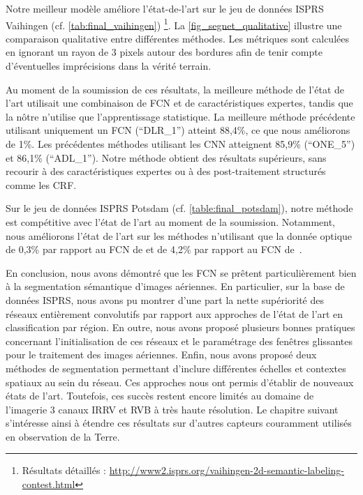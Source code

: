 Notre meilleur modèle améliore l'état-de-l'art sur le jeu de données ISPRS Vaihingen (cf. \cref{tab:final_vaihingen}) \footnote{Résultats détaillés : \url{http://www2.isprs.org/vaihingen-2d-semantic-labeling-contest.html}}. La \cref{fig_segnet_qualitative} illustre une comparaison qualitative entre différentes méthodes. Les métriques sont calculées en ignorant un rayon de $3$ pixels autour des bordures afin de tenir compte d'éventuelles imprécisions dans la vérité terrain.

Au moment de la soumission de ces résultats, la meilleure méthode de l'état de l'art utilisait une combinaison de \gls{FCN} et de caractéristiques expertes, tandis que la nôtre n'utilise que l'apprentissage statistique. La meilleure méthode précédente utilisant uniquement un \gls{FCN} (``DLR\_1'') atteint 88,4\%, ce que nous améliorons de 1\%. Les précédentes méthodes utilisant les \gls{CNN} atteignent 85,9\% (``ONE\_5''\cite{boulch_dag_2015}) et 86,1\% (``ADL\_1''\cite{paisitkriangkrai_effective_2015}). Notre méthode obtient des résultats supérieurs, sans recourir à des caractéristiques expertes ou à des post-traitement structurés comme les \gls{CRF}.

Sur le jeu de données ISPRS Potsdam (cf. \cref{table:final_potsdam}), notre méthode est compétitive avec l'état de l'art au moment de la soumission. Notamment, nous améliorons l'état de l'art sur les méthodes n'utilisant que la donnée optique de 0,3\% par rapport au \gls{FCN} de \citet{sherrah_fully_2016} et de 4,2\% par rapport au \gls{FCN} de~\citet{volpi_dense_2017}.

En conclusion, nous avons démontré que les \gls{FCN} se prêtent particulièrement bien à la segmentation sémantique d'images aériennes. En particulier, sur la base de données ISPRS, nous avons pu montrer d'une part la nette supériorité des réseaux entièrement convolutifs par rapport aux approches de l'état de l'art en classification par région. En outre, nous avons proposé plusieurs bonnes pratiques concernant l'initialisation de ces réseaux et le paramétrage des fenêtres glissantes pour le traitement des images aériennes. Enfin, nous avons proposé deux méthodes de segmentation permettant d'inclure différentes échelles et contextes spatiaux au sein du réseau. Ces approches nous ont permis d'établir de nouveaux états de l'art. Toutefois, ces succès restent encore limités au domaine de l'imagerie 3 canaux \gls{IRRV} et \gls{RVB} à très haute résolution. Le chapitre suivant s'intéresse ainsi à étendre ces résultats sur d'autres capteurs couramment utilisés en observation de la Terre.



